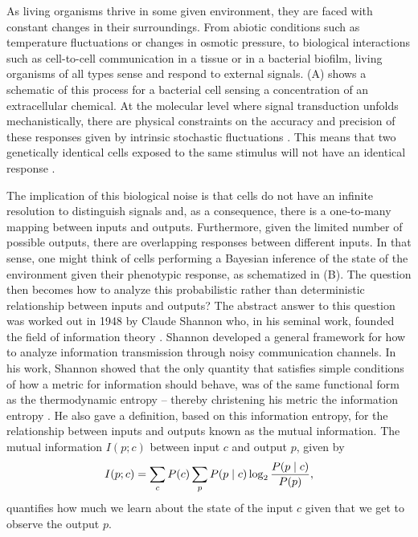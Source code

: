 As living organisms thrive in some given environment, they are faced with
constant changes in their surroundings. From abiotic conditions such as
temperature fluctuations or changes in osmotic pressure, to biological
interactions such as cell-to-cell communication in a tissue or in a bacterial
biofilm, living organisms of all types sense and respond to external signals.
(A) shows a schematic of this process for a bacterial cell
sensing a concentration of an extracellular chemical. At the molecular level
where signal transduction unfolds mechanistically, there are physical
constraints on the accuracy and precision of these responses given by
intrinsic stochastic fluctuations \cite{Nemenman2010}. This means that two
genetically identical cells exposed to the same stimulus will not have an
identical response \cite{Eldar2010}.

The implication of this biological noise is that cells do not have an infinite
resolution to distinguish signals and, as a consequence, there is a one-to-many
mapping between inputs and outputs. Furthermore, given the limited number of
possible outputs, there are overlapping responses between different inputs. In
that sense, one might think of cells performing a Bayesian inference of the
state of the environment given their phenotypic response, as schematized in
(B). The question then becomes how to analyze this
probabilistic rather than deterministic relationship between inputs and outputs?
The abstract answer to this question was worked out in 1948 by Claude Shannon
who, in his seminal work, founded the field of information theory
\cite{Shannon1948}. Shannon developed a general framework for how to analyze
information transmission through noisy communication channels. In his work,
Shannon showed that the only quantity that satisfies simple conditions of how a
metric for information should behave, was of the same functional form as the
thermodynamic entropy -- thereby christening his metric the information entropy
\cite{MacKay2003}. He also gave a definition, based on this information entropy,
for the relationship between inputs and outputs known as the mutual information.
The mutual information $I(p; c)$ between input $c$ and output $p$, given by
\begin{equation}
  I(p; c) = \sum_c P(c) \sum_p P(p \mid c) \log_2 {P(p \mid c) \over P(p)},
	\label{eq_mutual_info}
\end{equation}
quantifies how much we learn about the state of the input $c$ given that we get
to observe the output $p$.

